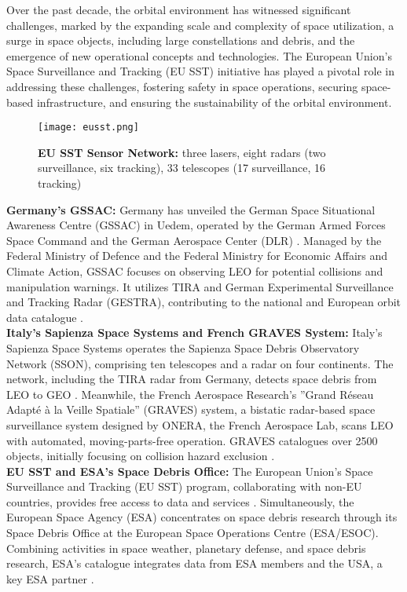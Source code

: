 Over the past decade, the orbital environment has witnessed significant challenges, marked by the expanding scale and complexity of space utilization, a surge in space objects, including large constellations and debris, and the emergence of new operational concepts and technologies. The European Union's Space Surveillance and Tracking (EU SST) initiative has played a pivotal role in addressing these challenges, fostering safety in space operations, securing space-based infrastructure, and ensuring the sustainability of the orbital environment.\\
\begin{figure}[h!]
	\centering
	\texttt{[image: eusst.png]}
	\caption{\textbf{EU SST Sensor Network:} three lasers, eight radars (two surveillance, six tracking), 33 telescopes (17 surveillance, 16 tracking) \cite{esa4}}\label{fig:eusst}
\end{figure}

\textbf{Germany's GSSAC:} Germany has unveiled the German Space Situational Awareness Centre (GSSAC) in Uedem, operated by the German Armed Forces Space Command and the German Aerospace Center (DLR) \cite{gss}. Managed by the Federal Ministry of Defence and the Federal Ministry for Economic Affairs and Climate Action, GSSAC focuses on observing LEO for potential collisions and manipulation warnings. It utilizes TIRA and German Experimental Surveillance and Tracking Radar (GESTRA), contributing to the national and European orbit data catalogue \cite{gss}.\\

\textbf{Italy's Sapienza Space Systems and French GRAVES System:} Italy's Sapienza Space Systems operates the Sapienza Space Debris Observatory Network (SSON), comprising ten telescopes and a radar on four continents. The network, including the TIRA radar from Germany, detects space debris from LEO to GEO \cite{rome,italy}. Meanwhile, the French Aerospace Research's ''Grand Réseau Adapté à la Veille Spatiale'' (GRAVES) system, a bistatic radar-based space surveillance system designed by ONERA, the French Aerospace Lab, scans LEO with automated, moving-parts-free operation. GRAVES catalogues over 2500 objects, initially focusing on collision hazard exclusion \cite{french1,french2}.\\

\textbf{EU SST and ESA's Space Debris Office:} The European Union's Space Surveillance and Tracking (EU SST) program, collaborating with non-EU countries, provides free access to data and services \cite{esa2}. Simultaneously, the European Space Agency (ESA) concentrates on space debris research through its Space Debris Office at the European Space Operations Centre (ESA/ESOC). Combining activities in space weather, planetary defense, and space debris research, ESA's catalogue integrates data from ESA members and the USA, a key ESA partner \cite{esa1}.

